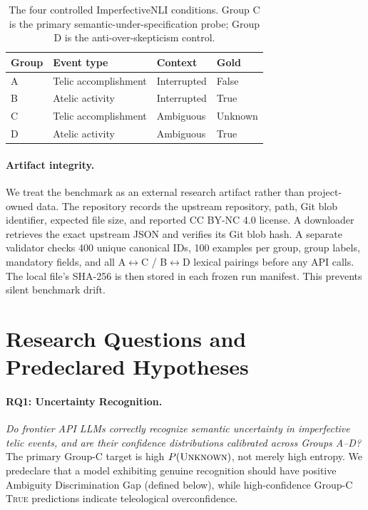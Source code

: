\documentclass[letterpaper]{article}
\begin{document}
\begin{table}[t]
\centering
\small
\begin{tabular}{@{}llll@{}}
\toprule
Group & Event type & Context & Gold \\
\midrule
A & Telic accomplishment & Interrupted & False \\
B & Atelic activity & Interrupted & True \\
C & Telic accomplishment & Ambiguous & Unknown \\
D & Atelic activity & Ambiguous & True \\
\bottomrule
\end{tabular}
\caption{The four controlled ImperfectiveNLI conditions. Group C is the primary semantic-under-specification probe; Group D is the anti-over-skepticism control.}
\label{tab:groups}
\end{table}

\paragraph{Artifact integrity.} We treat the benchmark as an external research artifact rather than project-owned data. The repository records the upstream repository, path, Git blob identifier, expected file size, and reported CC BY-NC 4.0 license. A downloader retrieves the exact upstream JSON and verifies its Git blob hash. A separate validator checks 400 unique canonical IDs, 100 examples per group, group labels, mandatory fields, and all A$\leftrightarrow$C / B$\leftrightarrow$D lexical pairings before any API calls. The local file's SHA-256 is then stored in each frozen run manifest. This prevents silent benchmark drift.

\section{Research Questions and Predeclared Hypotheses}
\paragraph{RQ1: Uncertainty Recognition.} \emph{Do frontier API LLMs correctly recognize semantic uncertainty in imperfective telic events, and are their confidence distributions calibrated across Groups A--D?} The primary Group-C target is high $P(\textsc{Unknown})$, not merely high entropy. We predeclare that a model exhibiting genuine recognition should have positive Ambiguity Discrimination Gap (defined below), while high-confidence Group-C \textsc{True} predictions indicate teleological overconfidence.
\end{document}
